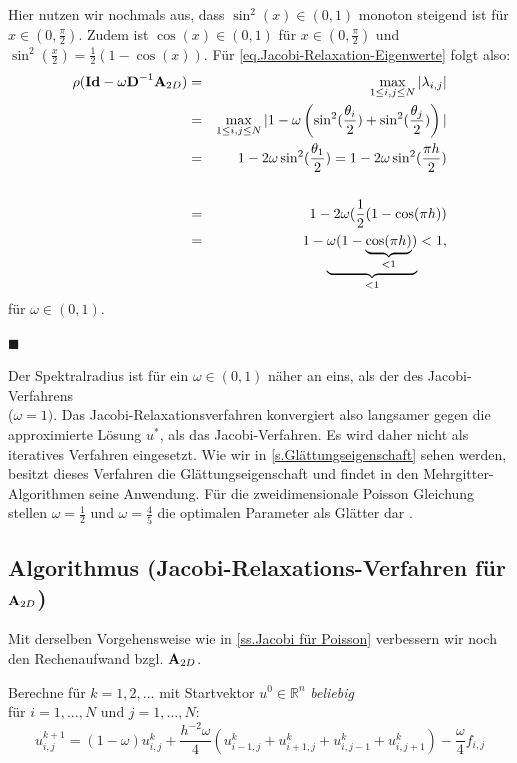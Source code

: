 Hier nutzen wir nochmals aus, dass $\sin^{2}(x) \in (0,1)$ monoton steigend ist für $x \in (0, \frac{\pi}{2})$. Zudem ist $\cos(x) \in (0,1)$ für $x \in (0,\frac{\pi}{2})$ und $\sin^{2}(\frac{x}{2}) = \frac{1}{2} (1 - \cos(x))$.
Für \autoref{eq.Jacobi-Relaxation-Eigenwerte} folgt also:
\begin{eqnarray}
\rho({\textbf{Id}}-\omega{\textbf{D}}^{-1}{\textbf{A}}_{2D}) &=& \max_{1 \le i,j \le N} | \lambda_{i,j} | \notag \\
&=& \max_{1 \le i,j \le N} | 1 - \omega \left(\sin^{2}(\frac {\theta_{i}} {2}) + \sin^{2}(\frac {\theta_{j}} {2}) \right) | \notag \\
&=& 1 - 2 \omega \sin^{2} (\frac {\theta_{1}} {2}) = 1 - 2 \omega \sin^{2} (\frac {\pi h} {2}) \notag \\ \notag \\
&=& 1 - 2 \omega (\frac{1} {2} (1 - \cos (\pi h)) \notag \\
&=& 1 - \underbrace{\omega(1 - \underbrace{\cos (\pi h)}_{< 1})}_{< 1} < 1, \notag
\end{eqnarray}
für $\omega \in (0,1)$.
\begin{flushright}
$\blacksquare$
\end{flushright}

Der Spektralradius ist für ein $\omega \in (0,1)$ näher an eins, als der des Jacobi-Verfahrens \\($\omega = 1)$. Das Jacobi-Relaxationsverfahren konvergiert also langsamer gegen die approximierte Lösung $u^{*}$, als das Jacobi-Verfahren. Es wird daher nicht als iteratives Verfahren eingesetzt. Wie wir in \autoref{s.Glättungseigenschaft} sehen werden, besitzt dieses Verfahren die Glättungseigenschaft und findet in den Mehrgitter-Algorithmen seine Anwendung. Für die zweidimensionale Poisson Gleichung stellen $\omega = \frac{1}{2}$ und $\omega = \frac{4}{5}$ die optimalen Parameter als Glätter dar \cite[S. 416]{SAAD03}.

\subsection{Algorithmus (Jacobi-Relaxations-Verfahren für ${\textbf{A}}_{2D}$)}\label{ss.Algorithmus Jacobi Relax Poisson}

Mit derselben Vorgehensweise wie in \autoref{ss.Jacobi für Poisson} verbessern wir noch den Rechenaufwand bzgl. ${\textbf{A}}_{2D}$.

Berechne für $k = 1,2,...$ mit Startvektor $u^{0} \in \mathbb{R}^{n}$ \textit{beliebig}\\
für $i = 1,...,N$ und $j = 1,...,N$:
\begin{equation}
u^{k+1}_{i,j} = (1 - \omega) u^{k}_{i,j} + \frac{h^{-2} \omega}{4} (u^{k}_{i-1,j} + u^{k}_{i+1,j} + u^{k}_{i,j-1} + u^{k}_{i,j+1}) - \frac{\omega}{4} f_{i,j}
\end{equation}

